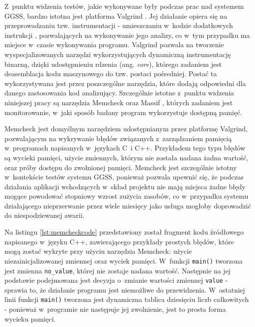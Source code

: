 Z~punktu widzenia testów, jakie wykonywane były podczas prac nad systemem GGSS, bardzo istotna jest platforma Valgrind \cite{valgrind}. Jej działanie opiera się na przeprowadzaniu tzw. instrumentacji - umieszczaniu w~kodzie dodatkowych instrukcji \cite{reverse}, pozwalających na wykonywanie jego analizy, co w~tym przypadku ma miejsce w~czasie wykonywania programu. Valgrind pozwala na tworzenie wyspecjalizowanych narzędzi wykorzystujących dynamiczną instrumentację binarną, dzięki udostępnieniu rdzenia (ang. \emph{core}), którego zadaniem jest deasemblacja kodu maszynowego do tzw. postaci pośredniej. Postać ta wykorzystywana jest przez poszczególne narzędzia, które dodają odpowiedni dla danego zastosowania kod analizujący. Szczególnie istotne z~punktu widzenia niniejszej pracy są narzędzia Memcheck \cite{memcheck_1} \cite{memcheck_2} oraz Massif \cite{massif}, których zadaniem jest monitorowanie, w~jaki sposób badany program wykorzystuje dostępną pamięć.

Memcheck jest domyślnym narzędziem udostępnianym przez platformę Valgrind, pozwalającym na wykrywanie błędów związanych z~zarządzaniem pamięcią w~programach napisanych w~językach C~i C++. Przykładem tego typu błędów są wycieki pamięci, użycie zmiennych, którym nie została nadana żadna wartość, oraz próby dostępu do zwolnionej pamięci. Memcheck jest szczególnie istotny w~kontekście testów systemu GGSS, ponieważ pozwala upewnić się, że podczas działania aplikacji wchodzących w~skład projektu nie mają miejsca żadne błędy mogące powodować stopniowy wzrost zużycia zasobów, co w~przypadku systemu działającego nieprzerwanie przez wiele miesięcy jako usługa mogłoby doprowadzić do niespodziewanej awarii. 

Na listingu \ref{lst:memcheckcode} przedstawiony został fragment kodu źródłowego napisanego w~języku C++, zawierającego przykłady prostych błędów, które mogą zostać wykryte przy użyciu narzędzia Memcheck: użycie niezainicjalizowanej zmiennej oraz wyciek pamięci. W~funkcji \lstinline{main()} tworzona jest zmienna \lstinline{no_value}, której nie zostaje nadana wartość. Następnie na jej podstawie podejmowana jest decyzja o~zmianie wartości zmiennej \lstinline{value} - sprawia to, że działanie programu jest niemożliwe do przewidzenia. W~ostatniej linii funkcji \lstinline{main()} tworzona jest dynamiczna tablica dziesięciu liczb całkowitych - ponieważ w~programie nie następuje jej zwolnienie, jest to prosta forma wycieku pamięci.



